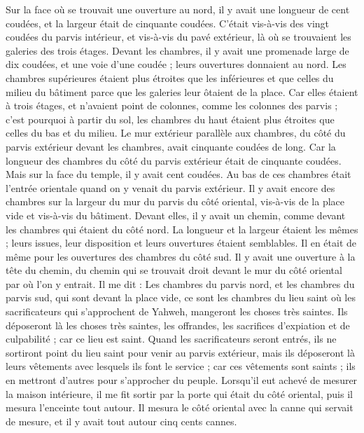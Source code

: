 \begin{multicols}{2}
Sur la face où se trouvait une ouverture au nord, il y avait une longueur de cent coudées, et la largeur était de cinquante coudées.
C’était vis-à-vis des vingt coudées du parvis intérieur, et vis-à-vis du pavé extérieur, là où se trouvaient les galeries des trois étages.
Devant les chambres, il y avait une promenade large de dix coudées, et une voie d’une coudée ; leurs ouvertures donnaient au nord.
Les chambres supérieures étaient plus étroites que les inférieures et que celles du milieu du bâtiment parce que les galeries leur ôtaient de la place.
Car elles étaient à trois étages, et n'avaient point de colonnes, comme les colonnes des parvis ; c’est pourquoi à partir du sol, les chambres du haut étaient plus étroites que celles du bas et du milieu.
Le mur extérieur parallèle aux chambres, du côté du parvis extérieur devant les chambres, avait cinquante coudées de long.
Car la longueur des chambres du côté du parvis extérieur était de cinquante coudées. Mais sur la face du temple, il y avait cent coudées.
Au bas de ces chambres était l’entrée orientale quand on y venait du parvis extérieur.
Il y avait encore des chambres sur la largeur du mur du parvis du côté oriental, vis-à-vis de la place vide et vis-à-vis du bâtiment.
Devant elles, il y avait un chemin, comme devant les chambres qui étaient du côté nord. La longueur et la largeur étaient les mêmes ; leurs issues, leur disposition et leurs ouvertures étaient semblables.
Il en était de même pour les ouvertures des chambres du côté sud. Il y avait une ouverture à la tête du chemin, du chemin qui se trouvait droit devant le mur du côté oriental par où l’on y entrait.
Il me dit : Les chambres du parvis nord, et les chambres du parvis sud, qui sont devant la place vide, ce sont les chambres du lieu saint où les sacrificateurs qui s’approchent de Yahweh, mangeront les choses très saintes. Ils déposeront là les choses très saintes, les offrandes, les sacrifices d’expiation et de culpabilité ; car ce lieu est saint.
Quand les sacrificateurs seront entrés, ils ne sortiront point du lieu saint pour venir au parvis extérieur, mais ils déposeront là leurs vêtements avec lesquels ils font le service ; car ces vêtements sont saints ; ils en mettront d’autres pour s’approcher du peuple.
Lorsqu'il eut achevé de mesurer la maison intérieure, il me fit sortir par la porte qui était du côté oriental, puis il mesura l’enceinte tout autour.
Il mesura le côté oriental avec la canne qui servait de mesure, et il y avait tout autour cinq cents cannes.

\end{multicols}
